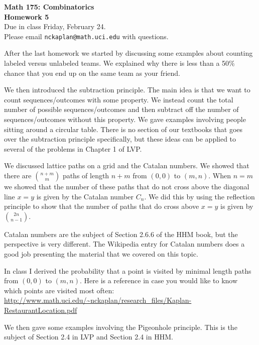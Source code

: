 \documentclass[11pt]{article}
\begin{document}
\begin{center}
{\Large \bf Math 175: Combinatorics} \\
{\Large \bf Homework 5}\\
{\Large Due in class Friday, February 24. \\
Please email \texttt{nckaplan@math.uci.edu} with questions.}
\end{center}

\vspace{5mm}

After the last homework we started by discussing some examples about counting labeled versus unlabeled teams.  We explained why there is less than a 50\% chance that you end up on the same team as your friend.

We then introduced the subtraction principle.  The main idea is that we want to count sequences/outcomes with some property.  We instead count the total number of possible sequences/outcomes and then subtract off the number of sequences/outcomes without this property.  We gave examples involving people sitting around a circular table.  There is no section of our textbooks that goes over the subtraction principle specifically, but these ideas can be applied to several of the problems in Chapter 1 of LVP.

We discussed lattice paths on a grid and the Catalan numbers.  We showed that there are $\binom{n+m}{m}$ paths of length $n+m$ from $(0,0)$ to $(m,n)$.  When $n=m$ we showed that the number of these paths that do not cross above the diagonal line $x=y$ is given by the Catalan number $C_n$.  We did this by using the reflection principle to show that the number of paths that do cross above $x=y$ is given by $\binom{2n}{n-1}$.  

Catalan numbers are the subject of Section 2.6.6 of the HHM book, but the perspective is very different.  The Wikipedia entry for Catalan numbers does a good job presenting the material that we covered on this topic.  

In class I derived the probability that a point is visited by minimal length  paths from $(0,0)$ to $(m,n)$.  Here is a reference in case you would like to know which points are visited most often:\\
\url{http://www.math.uci.edu/~nckaplan/research_files/Kaplan-RestaurantLocation.pdf}

We then gave some examples involving the Pigeonhole principle.  This is the subject of Section 2.4 in LVP and Section 2.4 in HHM.  
\end{document}
